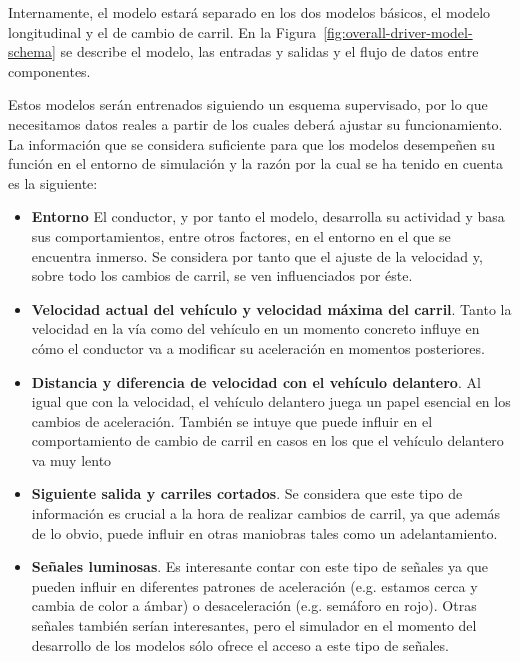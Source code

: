 Internamente, el modelo estará separado en los dos modelos básicos, el modelo longitudinal y el de cambio de carril. En la Figura~\ref{fig:overall-driver-model-schema} se describe el modelo, las entradas y salidas y el flujo de datos entre componentes.

\begin{figure*}
	\centering
	\caption[Esquema general del modelo de conductor planteado]{Esquema general del modelo de conductor planteado en la tesis. En éste se puede ver cómo se distribuyen los estímulos de entrada entre los diferentes componentes del modelo y las salidas del sistema, que irán conectadas a los actuadores pertinentes.}
	\label{fig:overall-driver-model-schema}
\end{figure*}

Estos modelos serán entrenados siguiendo un esquema supervisado, por lo que necesitamos datos reales a partir de los cuales deberá ajustar su funcionamiento. La información que se considera suficiente para que los modelos desempeñen su función en el entorno de simulación y la razón por la cual se ha tenido en cuenta es la siguiente:

\begin{itemize}
	\item \textbf{Entorno} El conductor, y por tanto el modelo, desarrolla su actividad y basa sus comportamientos, entre otros factores, en el entorno en el que se encuentra inmerso. Se considera por tanto que el ajuste de la velocidad y, sobre todo los cambios de carril, se ven influenciados por éste.
	\item \textbf{Velocidad actual del vehículo y velocidad máxima del carril}. Tanto la velocidad en la vía como del vehículo en un momento concreto influye en cómo el conductor va a modificar su aceleración en momentos posteriores.
	\item \textbf{Distancia y diferencia de velocidad con el vehículo delantero}. Al igual que con la velocidad, el vehículo delantero juega un papel esencial en los cambios de aceleración. También se intuye que puede influir en el comportamiento de cambio de carril en casos en los que el vehículo delantero va muy lento
	\item \textbf{Siguiente salida y carriles cortados}. Se considera que este tipo de información es crucial a la hora de realizar cambios de carril, ya que además de lo obvio, puede influir en otras maniobras tales como un adelantamiento.
	\item \textbf{Señales luminosas}. Es interesante contar con este tipo de señales ya que pueden influir en diferentes patrones de aceleración (e.g. estamos cerca y cambia de color a ámbar) o desaceleración (e.g. semáforo en rojo). Otras señales también serían interesantes, pero el simulador en el momento del desarrollo de los modelos sólo ofrece el acceso a este tipo de señales.
\end{itemize}

